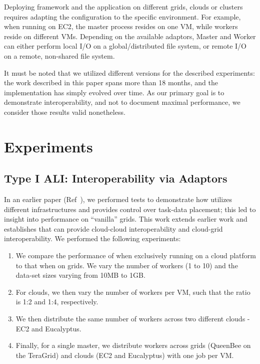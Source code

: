 \documentclass[3p,twocolumn]{elsarticle}
\begin{document}
Deploying \sagamapreduce framework and the \wc application on
different grids, clouds or clusters requires adapting the configuration
to the specific environment.  For example, when running \sagamapreduce
on EC2, the master process resides on one VM, while workers reside on
different VMs.  Depending on the available adaptors, Master and Worker
can either perform local I/O on a global/distributed file system, or
remote I/O on a remote, non-shared file system.

It must be noted that we utilized different \smr versions for the
described experiments: the work described in this paper spans more
than 18 months, and the \smr implementation has simply evolved over
time.  As our primary goal is to demonstrate interoperability, and not
to document maximal performance, we consider those results valid
nonetheless.


\section{Experiments}
\label{sec:exp}

\subsection{Type I ALI: Interoperability via Adaptors}

In an earlier paper (Ref~\cite{saga_ccgrid09}), we performed tests to
demonstrate how \sagamapreduce utilizes different infrastructures and
provides control over task-data placement; this led to insight into
performance on ``vanilla'' grids.  This work extends earlier work and
establishes that \sagamapreduce can provide cloud-cloud
interoperability and cloud-grid interoperability.  We performed the
following experiments:

\begin{enumerate}

 \item We compare the performance of \sagamapreduce when exclusively
 running on a cloud platform to that when on grids. We vary the number
 of workers (1 to 10) and the data-set sizes varying from 10MB to 1GB.

 \item For clouds, we then vary the number of workers per VM, such
 that the ratio is 1:2 and 1:4, respectively.

 \item We then distribute the same number of workers across two
 different clouds - EC2 and Eucalyptus.

 \item Finally, for a single master, we distribute workers across
 grids (QueenBee on the TeraGrid) and clouds (EC2 and Eucalyptus) with
 one job per VM.

\end{enumerate}
\end{document}
